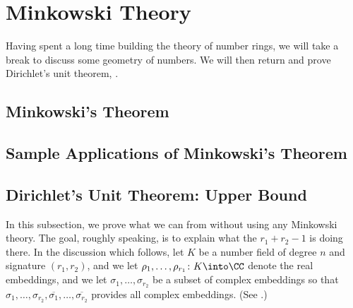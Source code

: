 \documentclass[../notes.tex]{subfiles}
\begin{document}
\section{Minkowski Theory}

Having spent a long time building the theory of number rings, we will take a break to discuss some geometry of numbers. We will then return and prove Dirichlet's unit theorem, .

\subsection{Minkowski's Theorem}

\subsection{Sample Applications of Minkowski's Theorem}

\subsection{Dirichlet's Unit Theorem: Upper Bound}
In this subsection, we prove what we can from  without using any Minkowski theory. The goal, roughly speaking, is to explain what the $r_1+r_2-1$ is doing there. In the discussion which follows, let $K$ be a number field of degree $n$ and signature $(r_1,r_2)$, and we let $\rho_1,\ldots,\rho_{r_1}\colon K\into\CC$ denote the real embeddings, and we let $\sigma_1,\ldots,\sigma_{r_2}$ be a subset of complex embeddings so that $\sigma_1,\ldots,\sigma_{r_2},\overline{\sigma_1},\ldots,\overline{\sigma_{r_2}}$ provides all complex embeddings. (See .)
\end{document}
